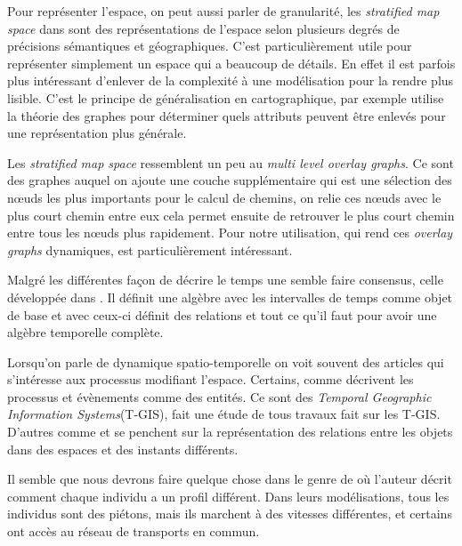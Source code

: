 \documentclass[a4paper]{article}
\begin{document}
Pour représenter l'espace, on peut aussi parler de granularité, les \emph{stratified map space} dans
\cite{stell1998} sont des représentations de l'espace selon plusieurs degrés de
précisions sémantiques et géographiques. C'est particulièrement utile pour
représenter simplement un espace qui a beaucoup de détails. En effet il est
parfois plus intéressant d'enlever de la complexité à une modélisation pour la
rendre plus lisible. C'est le principe de généralisation en cartographique, par
exemple \cite{mackaness1993} utilise la théorie des graphes pour déterminer
quels attributs peuvent être enlevés pour une représentation plus générale.

Les \emph{stratified map space} ressemblent un peu au \emph{multi level overlay
graphs}\cite{holzer2009}. Ce sont des graphes auquel on ajoute une couche
supplémentaire qui est une sélection des nœuds les plus importants pour le
calcul de chemins, on relie ces nœuds avec le plus court chemin entre eux cela
permet ensuite de retrouver le plus court chemin entre tous les nœuds plus
rapidement. Pour notre utilisation, \cite{bruera2008} qui rend ces \emph{overlay
graphs} dynamiques, est particulièrement intéressant.

Malgré les différentes façon de décrire le temps une semble faire consensus,
celle développée dans \cite{allen1985}. Il définit une algèbre avec les
intervalles de temps comme objet de base et avec ceux-ci définit des relations
et tout ce qu'il faut pour avoir une algèbre temporelle complète.

Lorsqu'on parle de dynamique spatio-temporelle on voit souvent des articles qui
s'intéresse aux processus modifiant l'espace. Certains, comme
\cite{claramunt1995} décrivent les processus et évènements comme des entités.
Ce sont des \emph{Temporal Geographic Information Systems}(T-GIS),
\cite{siabato2018} fait une étude de tous travaux fait sur les T-GIS. D'autres
comme \cite{delmondo2011} et \cite{costes2015} se penchent sur la représentation
des relations entre les objets dans des espaces et des instants différents.

Il semble que nous devrons faire quelque chose dans le genre de
\cite{jguirim2015} où l'auteur décrit comment chaque individu a un profil
différent. Dans leurs modélisations, tous les individus sont des piétons, mais
ils marchent à des vitesses différentes, et certains ont accès au réseau de
transports en commun.
\end{document}

